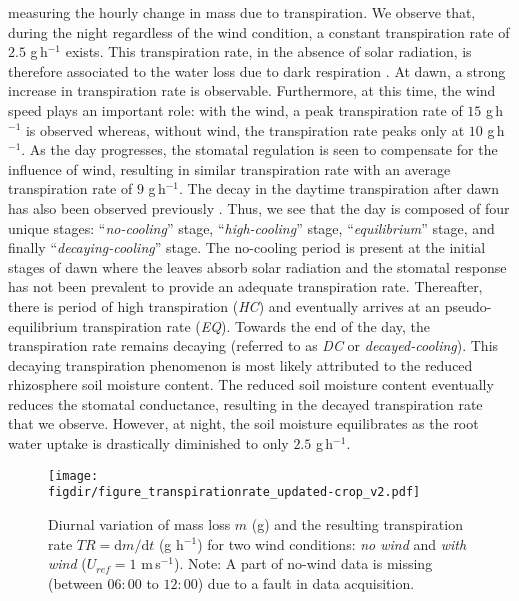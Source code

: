 measuring the hourly change in mass due to transpiration. We observe that, during the night regardless of the wind condition, a constant transpiration rate of $2.5$ g\,h$^{-1}$ exists. This transpiration rate, in the absence of solar radiation, is therefore associated to the water loss due to dark respiration \citep{Farquhar1980, Lambers2008, Launiainen2015}. At dawn, a strong increase in transpiration rate is observable. Furthermore, at this time, the wind speed plays an important role: with the wind, a peak transpiration rate of $15$ g\,h$^{-1}$ is observed whereas, without wind, the transpiration rate peaks only at $10$ g\,h$^{-1}$. As the day progresses, the stomatal regulation is seen to compensate for the influence of wind, resulting in similar transpiration rate with an average transpiration rate of $9$ g\,h$^{-1}$. The decay in the daytime transpiration after dawn has also been observed previously \citep{Javaux2013, Tuzet2003}. Thus, we see that the day is composed of four unique stages: ``\textit{no-cooling}'' stage, ``\textit{high-cooling}'' stage, ``\textit{equilibrium}'' stage, and finally ``\textit{decaying-cooling}'' stage. The no-cooling period is present at the initial stages of dawn where the leaves absorb solar radiation and the stomatal response has not been prevalent to provide an adequate transpiration rate. Thereafter, there is period of high transpiration (\textit{HC}) and eventually arrives at an pseudo-equilibrium transpiration rate (\textit{EQ}). Towards the end of the day, the transpiration rate remains decaying (referred to as \textit{DC} or \textit{decayed-cooling}). This decaying transpiration phenomenon is most likely attributed to the reduced rhizosphere soil moisture content. The reduced soil moisture content eventually reduces the stomatal conductance, resulting in the decayed transpiration rate that we observe. However, at night, the soil moisture equilibrates as the root water uptake is drastically diminished to only $2.5$ g\,h$^{-1}$.

\begin{figure}[t]
	\centering
	\texttt{[image: \\figdir/figure\_transpirationrate\_updated-crop\_v2.pdf]}
	\caption{Diurnal variation of mass loss $m$ (g) and the resulting transpiration rate $TR=\mathrm{d}m/\mathrm{d}t$ (g h$^{-1}$) for two wind conditions: \textit{no wind} and \textit{with wind} ($U_{ref}=1$ m\,s$^{-1}$). Note: A part of no-wind data is missing (between $06:00$ to $12:00$) due to a fault in data acquisition.}
	\label{fig:figure_transpirationrate}
\end{figure}

